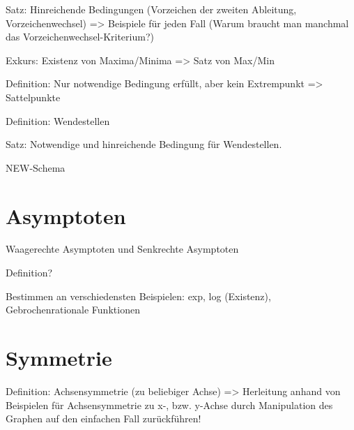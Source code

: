 Satz: Hinreichende Bedingungen (Vorzeichen der zweiten Ableitung, Vorzeichenwechsel)
=> Beispiele für jeden Fall (Warum braucht man manchmal das Vorzeichenwechsel-Kriterium?)
\begin{theorem}
    
\end{theorem}

Exkurs: Existenz von Maxima/Minima => Satz von Max/Min

Definition: Nur notwendige Bedingung erfüllt, aber kein Extrempunkt => Sattelpunkte
\begin{definition}[Sattelpunkt]
    
\end{definition}

Definition: Wendestellen
\begin{definition}[Wendestelle]
    
\end{definition}

Satz: Notwendige und hinreichende Bedingung für Wendestellen. 
\begin{theorem}
    
\end{theorem}

NEW-Schema

\section{Asymptoten}
\begin{definition}
    
\end{definition}

Waagerechte Asymptoten und Senkrechte Asymptoten

Definition? 

Bestimmen an verschiedensten Beispielen: exp, log (Existenz), Gebrochenrationale Funktionen

\section{Symmetrie}
Definition: Achsensymmetrie (zu beliebiger Achse) => Herleitung anhand von Beispielen für Achsensymmetrie zu x-, bzw. y-Achse durch Manipulation des Graphen auf den einfachen Fall zurückführen!

\begin{definition}
    
\end{definition}

